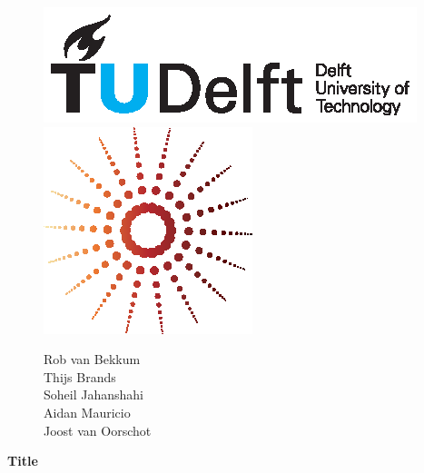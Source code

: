 \documentclass{article}
\begin{document}
\begin{figure}
    \begin{minipage}[H]{0.33\textwidth}
		\vspace{0.3cm}
		\includegraphics[scale=0.8]{images/TUDelftLogo.eps}
	\end{minipage}
	\begin{minipage}[H]{0.33\textwidth}
		\begin{center}
		\end{center}
		
		\begin{center}
			\includegraphics[scale=0.8]{images/Lg.eps}	
		
		\end{center}
	\end{minipage}
	\begin{minipage}[H]{0.33\textwidth}
			\begin{flushright}
				\small{Rob van Bekkum }\\
				\small{Thijs Brands }\\
				\small{Soheil Jahanshahi }\\
				\small{Aidan Mauricio }\\
				\small{Joost van Oorschot }

			\end{flushright}
			
	\end{minipage}
\end{figure}

\begin{minipage}[H]{\textwidth}
\vspace{0.3cm}
		\begin{center}
		
		\vspace{0.3cm}
			\Huge{\textbf{Title}}\\
		\vspace{0.3cm}	
		
		\vspace{0.7cm}	
		\end{center}
	\end{minipage}
	
\end{document}
